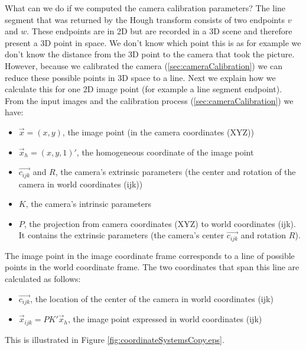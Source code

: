 	What can we do if we computed the camera calibration parameters?
	The line segment that was returned by the Hough transform consists of two
	endpoints $v$ and $w$. These endpoints are in 2D but are recorded in a 3D
	scene and therefore present a 3D point in space. We don't know which point
	this is as for example we don't know the distance from the 3D point to the camera that took
	the picture. 
	However, because we calibrated the camera (\ref{sec:cameraCalibration}) we
	can reduce these possible points in 3D space to a line. Next we explain how
	we calculate this for one 2D image point (for example a line segment endpoint).\\

	From the input images and the calibration process
	(\ref{sec:cameraCalibration}) we have:
	\begin{itemize}
		\item $\vec{x} = (x,y)$, the image point (in the camera coordinates
		(XYZ))
		\item $\vec{x}_{h} = (x,y,1)'$, the homogeneous coordinate of the image point
		\item $\vec{c_{ijk}}$ and $R$, the camera's extrinsic parameters (the
		center and rotation of the camera in world coordinates (ijk))
		\item $K$, the camera's intrinsic parameters
		\item $P$, the projection from camera coordinates (XYZ) to world
		coordinates (ijk). It contains the 
		extrinsic parameters (the camera's center $\vec{c_{ijk}}$ and rotation 
		$R$).
	\end{itemize}

	The image point in the image coordinate frame corresponds to a line of
	possible points in the world coordinate frame.  The two coordinates that
	span this line are calculated as follows:
	\begin{itemize}
		\item $\vec{c_{ijk}}$, the location of the center of the camera in 
		world coordinates (ijk)
		\item $\vec{x}_{ijk} = P K' \vec{x}_{h}$, the image point expressed in world coordinates (ijk)\\
	\end{itemize}
	This is illustrated in Figure \ref{fig:coordinateSystemsCopy.eps}.

	\clearpage

